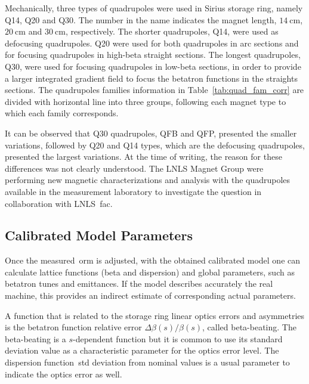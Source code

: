Mechanically, three types of quadrupoles were used in Sirius storage ring, namely Q14, Q20 and Q30. The number in the name indicates the magnet length, $\SI{14}{\cm}$, $\SI{20}{\cm}$ and $\SI{30}{\cm}$, respectively. The shorter quadrupoles, Q14, were used as defocusing quadrupoles. Q20 were used for both quadrupoles in arc sections and for focusing quadrupoles in high-beta straight sections. The longest quadrupoles, Q30, were used for focusing quadrupoles in low-beta sections, in order to provide a larger integrated gradient field to focus the betatron functions in the straights sections. The quadrupoles families information in Table~\ref{tab:quad_fam_corr} are divided with horizontal line into three groups, following each magnet type to which each family corresponds. 

It can be observed that Q30 quadrupoles, QFB and QFP, presented the smaller variations, followed by Q20 and Q14 types, which are the defocusing quadrupoles, presented the largest variations. At the time of writing, the reason for these differences was not clearly understood. The LNLS Magnet Group were performing new magnetic characterizations and analysis with the quadrupoles available in the measurement laboratory to investigate the question in collaboration with LNLS~\gls{fac}.

\subsection{Calibrated Model Parameters}
Once the measured~\gls{orm} is adjusted, with the obtained calibrated model one can calculate lattice functions (beta and dispersion) and global parameters, such as betatron tunes and emittances. If the model describes accurately the real machine, this provides an indirect estimate of corresponding actual parameters.

A function that is related to the storage ring linear optics errors and asymmetries is the betatron function relative error $\Delta \beta(s)/\beta(s)$, called beta-beating. The beta-beating is a $s$-dependent function but it is common to use its standard deviation value as a characteristic parameter for the optics error level. The dispersion function~\gls{std} deviation from nominal values is a usual parameter to indicate the optics error as well.

